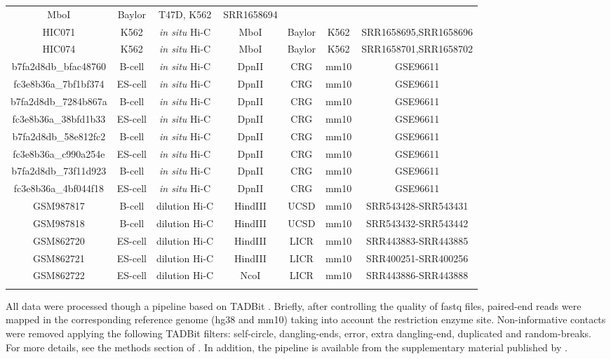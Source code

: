 \documentclass{bioinfo}
\begin{document}
\begin{methods}
\begin{table}
{\begin{tabular}{ccccccc}
  MboI & Baylor & T47D, K562 &    SRR1658694 \\
HIC071  & K562 & \textit{in situ} Hi-C &
  MboI & Baylor & K562 & SRR1658695,SRR1658696 \\
HIC074  & K562 & \textit{in situ} Hi-C &
  MboI & Baylor & K562 & SRR1658701,SRR1658702 \\
b7fa2d8db\_bfac48760 & B-cell  & \textit{in situ} Hi-C &
  DpnII & CRG & mm10 & GSE96611 \\
fc3e8b36a\_7bf1bf374 & ES-cell & \textit{in situ} Hi-C &
  DpnII & CRG & mm10 & GSE96611 \\
b7fa2d8db\_7284b867a & B-cell  & \textit{in situ} Hi-C &
  DpnII & CRG & mm10 & GSE96611 \\
fc3e8b36a\_38bfd1b33 & ES-cell & \textit{in situ} Hi-C &
  DpnII & CRG & mm10 & GSE96611 \\
b7fa2d8db\_58e812fc2 & B-cell  & \textit{in situ} Hi-C &
  DpnII & CRG & mm10 & GSE96611 \\
fc3e8b36a\_c990a254e & ES-cell & \textit{in situ} Hi-C &
  DpnII & CRG & mm10 & GSE96611 \\
b7fa2d8db\_73f11d923 & B-cell  & \textit{in situ} Hi-C &
  DpnII & CRG & mm10 & GSE96611 \\
fc3e8b36a\_4bf044f18 & ES-cell & \textit{in situ} Hi-C &
  DpnII & CRG & mm10 & GSE96611 \\
GSM987817 & B-cell  & dilution Hi-C &
  HindIII & UCSD & mm10 & SRR543428-SRR543431 \\
GSM987818 & B-cell  & dilution Hi-C &
  HindIII & UCSD & mm10 & SRR543432-SRR543442 \\
GSM862720 & ES-cell & dilution Hi-C &
  HindIII & LICR & mm10 & SRR443883-SRR443885 \\
GSM862721 & ES-cell & dilution Hi-C &
  HindIII & LICR & mm10 & SRR400251-SRR400256 \\
GSM862722 & ES-cell & dilution Hi-C &
  NcoI    & LICR & mm10 & SRR443886-SRR443888 \\
  \botrule
\end{tabular}}{}
\end{table}


All data were processed though a pipeline based on TADBit
\citep{serra2016structural}. Briefly, after controlling the quality of
fastq files, paired-end reads were mapped in the corresponding reference
genome (hg38 and mm10) taking into account the restriction enzyme site.
Non-informative contacts were removed applying the following TADBit
filters: self-circle, dangling-ends, error, extra dangling-end, duplicated
and random-breaks. For more details, see the methods section of
\cite{stadhouders2017transcription}. In addition, the pipeline is
available from the supplementary material published by
\cite{quilez2017managing}.


\end{methods}
\end{document}
